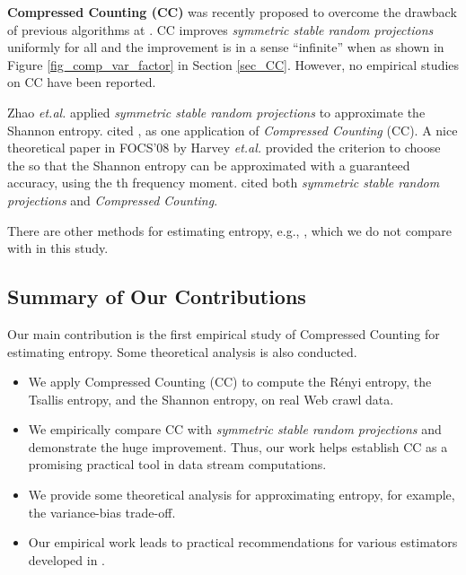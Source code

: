 \documentclass{sig-alternate}
\begin{document}
\textbf{Compressed Counting (CC)}\cite{Article:Li_CC_v0,Article:Li_CC,Report:Li_CC_oq} was recently proposed to overcome the drawback of previous algorithms at . CC improves {\em symmetric stable random projections} uniformly for all  and the improvement is in a sense ``infinite'' when  as shown in Figure \ref{fig_comp_var_factor} in Section \ref{sec_CC}. However, no empirical studies on CC have been reported.

Zhao {\em et.al.}\cite{Proc:Zhao_IMC07} applied {\em symmetric stable random projections} to approximate the Shannon entropy. \cite{Article:Li_CC} cited \cite{Proc:Zhao_IMC07}, as one application of {\em Compressed Counting} (CC).  A nice  theoretical paper in FOCS'08 by Harvey {\em et.al.}\cite{Article:Harvey_entropy_arXiv08,Proc:Harvey_FOCS08} provided the criterion to choose the  so that the Shannon entropy can be approximated with a guaranteed accuracy, using the th frequency moment. \cite{Proc:Harvey_FOCS08} cited both {\em symmetric stable random projections}\cite{Article:Indyk_JACM06,Proc:Li_SODA08} and {\em Compressed Counting}\cite{Article:Li_CC}.


There are other methods for estimating entropy, e.g., \cite{Proc:Guha_SODA06}, which we do not compare with in this study.

\subsection{Summary of Our Contributions}

Our main contribution is the first empirical study of Compressed Counting for estimating entropy.  Some theoretical analysis is also conducted.
\begin{itemize}
\item  We apply Compressed Counting (CC) to compute the R\'enyi entropy, the Tsallis entropy, and the Shannon entropy, on real Web crawl data.
\item We empirically compare CC with {\em symmetric stable random projections} and demonstrate the huge improvement. Thus, our work helps establish CC as a promising practical tool in data stream computations.
\item We provide some theoretical analysis for approximating entropy, for example, the variance-bias trade-off.
\item Our empirical work leads to practical recommendations for various estimators developed in \cite{Article:Li_CC_v0,Article:Li_CC,Report:Li_CC_oq}.
\end{itemize}
\end{document}
